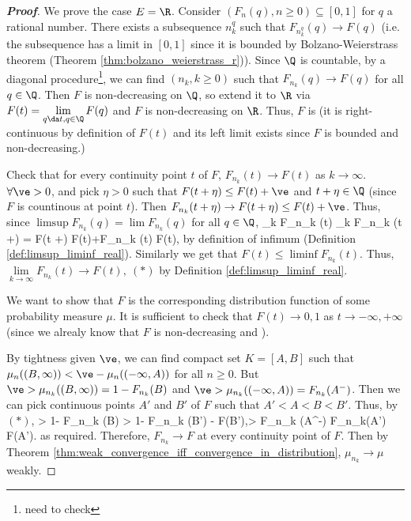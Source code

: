 \begin{proof}[\bf Proof]
We prove the case $E = \R$. Consider $(F_n (q), n \geq 0) \subseteq [0, 1]$ for $q$ a rational number. There exists a subsequence $n^q_k$ such that $F_{n^q_k}(q)\to  F(q)$ (i.e. the subsequence has a limit in $[0, 1]$ since it is bounded by Bolzano-Weierstrass theorem (Theorem \ref{thm:bolzano_weierstrass_r})). Since $\Q$ is countable, by a diagonal procedure\footnote{need to check}, we can find $(n_k, k \geq 0)$ such that $F_{n_k}(q)\to F(q)$ for all $q \in \Q$. Then $F$ is non-decreasing on $\Q$, so extend it to $\R$ via $F(t) = \lim\limits_{q\da t,q\in \Q} F(q)$ and $F$ is non-decreasing on $\R$. Thus, $F$ is \cadlag (it is right-continuous by definition of $F(t)$ and its left limit exists since $F$ is bounded and non-decreasing.)

Check that for every continuity point $t$ of $F$, $F_{n_k} (t) \to  F(t)$ as $k \to \infty$. $\forall \ve > 0$, and pick $\eta > 0$ such that $F(t + \eta) \leq F(t) + \ve$ and $t + \eta \in \Q$ (since $F$ is countinous at point $t$). Then $F_{n_k} (t +\eta)\to  F(t +\eta) \leq F(t)+\ve$. Thus, since $\limsup F_{n_k}(q) = \lim F_{n_k}(q)$ for all $q\in \Q$,
\beast
\limsup_k F_{n_k} (t) \leq \limsup_k F_{n_k} (t +\eta) = F(t +\eta) \leq F(t)+\ve\quad\ra\quad \limsup F_{n_k} (t) \leq F(t),
\eeast%
by definition of infimum (Definition \ref{def:limsup_liminf_real}). Similarly we get that $F(t) \leq \liminf F_{n_k}(t)$. Thus, $\lim\limits_{k\to \infty} F_{n_k}(t) \to F(t),\ (*)$ by Definition \ref{def:limsup_liminf_real}.%

We want to show that $F$ is the corresponding distribution function of some probability measure $\mu$. It is sufficient to check that $F(t) \to  0, 1$ as $t \to  -\infty,+\infty$ (since we alrealy know that $F$ is non-decreasing and \cadlag).

By tightness given $\ve$, we can find compact set $K = [A, B]$ such that $\mu_n((B,\infty)) < \ve - \mu_n((-\infty,A))$ for all $n \geq 0$. But $\ve > \mu_{n_k} ((B,\infty)) = 1- F_{n_k} (B)$ and $\ve > \mu_{n_k} ((-\infty,A)) = F_{n_k} (A^-)$. Then we can pick continuous points $A'$ and $B'$ of $F$ such that $A'<A<B<B'$. Thus, by $(*)$,
\be
\ve > 1- F_{n_k} (B) > 1- F_{n_k} (B')  - F(B'),\quad\quad \ve > F_{n_k} (A^-) \geq F_{n_k}(A') \to F(A').
\ee
as required. Therefore, $F_{n_k} \to  F$ at every continuity point of $F$. Then by Theorem \ref{thm:weak_convergence_iff_convergence_in_distribution}, $\mu_{n_k} \to \mu$ weakly.
\end{proof}


